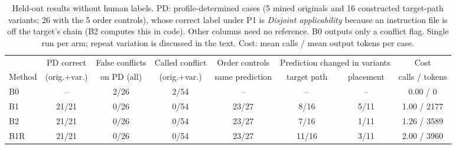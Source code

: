 \begin{table}[t]
\caption{Held-out results without human labels. PD: profile-determined cases (5 mined originals and 16 constructed target-path variants; 26 with the 5 order controls), whose correct label under P1 is \emph{Disjoint applicability} because an instruction file is off the target's chain (B2 computes this in code). Other columns need no reference. B0 outputs only a conflict flag. Single run per arm; repeat variation is discussed in the text. Cost: mean calls / mean output tokens per case.}
\label{tab:results}
\centering\footnotesize
\begin{tabular}{lccccccc}
\toprule
 & PD correct & False conflicts & Called conflict & Order controls & \multicolumn{2}{c}{Prediction changed in variants} & Cost \\ \cmidrule(lr){6-7}
Method & (orig.+var.) & on PD (all) & (orig.+var.) & same prediction & target path & placement & calls / tokens \\
\midrule
B0 & -- & 2/26 & 2/54 & -- & -- & -- & 0.00 / 0 \\
B1 & 21/21 & 0/26 & 0/54 & 23/27 & 8/16 & 5/11 & 1.00 / 2177 \\
B2 & 21/21 & 0/26 & 0/54 & 23/27 & 7/16 & 1/11 & 1.26 / 3589 \\
B1R & 21/21 & 0/26 & 0/54 & 23/27 & 11/16 & 3/11 & 2.00 / 3960 \\
\bottomrule
\end{tabular}
\end{table}
